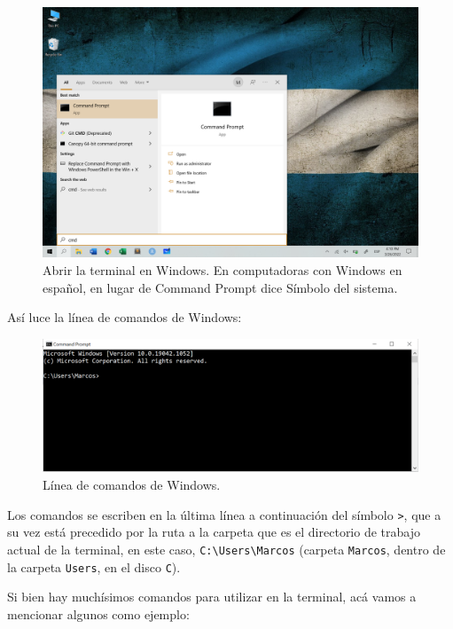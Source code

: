\documentclass[
]{book}
\begin{document}
\begin{figure}

{\centering \includegraphics[width=0.8\linewidth]{images/07_otros/terminal} 

}

\caption{Abrir la terminal en Windows. En computadoras con Windows en español, en lugar de Command Prompt dice Símbolo del sistema.}\label{fig:unnamed-chunk-279}
\end{figure}

Así luce la línea de comandos de Windows:

\begin{figure}

{\centering \includegraphics[width=0.8\linewidth]{images/07_otros/terminal2} 

}

\caption{Línea de comandos de Windows.}\label{fig:unnamed-chunk-280}
\end{figure}

Los comandos se escriben en la última línea a continuación del símbolo \texttt{\textgreater{}}, que a su vez está precedido por la ruta a la carpeta que es el directorio de trabajo actual de la terminal, en este caso, \texttt{C:\textbackslash{}Users\textbackslash{}Marcos} (carpeta \texttt{Marcos}, dentro de la carpeta \texttt{Users}, en el disco \texttt{C}).

Si bien hay muchísimos comandos para utilizar en la terminal, acá vamos a mencionar algunos como ejemplo:
\end{document}
